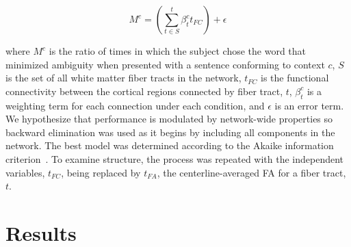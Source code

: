 \documentclass[final,authoryear,5p,times,twocolumn]{elsarticle}
\begin{document}
\begin{equation}
M^{c} = \left( \sum^{t}_{t \in S} \beta_{t}^{c} t_{FC} \right) + \epsilon
\end{equation}

where $M^{c}$ is the ratio of times in which the subject chose the word that minimized ambiguity when presented with a sentence conforming to context $c$, $S$ is the set of all white matter fiber tracts in the network, $t_{FC}$ is the functional connectivity between the cortical regions connected by fiber tract, $t$, $\beta_{t}^{c}$ is a weighting term for each connection under each condition, and $\epsilon$ is an error term. We hypothesize that performance is modulated by network-wide properties so backward elimination was used as it begins by including all components in the network. The best model was determined according to the Akaike information criterion~\citep{Akaike1974}. To examine structure, the process was repeated with the independent variables, $t_{FC}$, being replaced by $t_{FA}$, the centerline-averaged FA for a fiber tract, $t$.

\section{Results}
\end{document}
